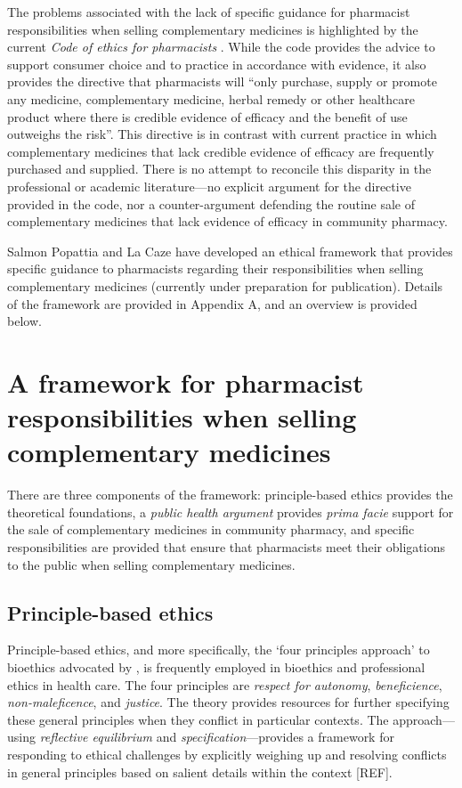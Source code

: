 \documentclass[11pt,a4paper]{article}
\begin{document}
The problems associated with the lack of specific guidance for
pharmacist responsibilities when selling complementary medicines is
highlighted by the current \emph{Code of ethics for pharmacists}
\autocite{PSA2017}. While the code provides the advice to support
consumer choice and to practice in accordance with evidence, it also
provides the directive that pharmacists will ``only purchase, supply or
promote any medicine, complementary medicine, herbal remedy or other
healthcare product where there is credible evidence of efficacy and the
benefit of use outweighs the risk''. This directive is in contrast with
current practice in which complementary medicines that lack credible
evidence of efficacy are frequently purchased and supplied. There is no
attempt to reconcile this disparity in the professional or academic
literature---no explicit argument for the directive provided in the
code, nor a counter-argument defending the routine sale of complementary
medicines that lack evidence of efficacy in community pharmacy.

Salmon Popattia and La Caze have developed an ethical framework that
provides specific guidance to pharmacists regarding their
responsibilities when selling complementary medicines (currently under
preparation for publication). Details of the framework are provided in
Appendix A, and an overview is provided below.

\section{A framework for pharmacist responsibilities when selling
complementary
medicines}\label{a-framework-for-pharmacist-responsibilities-when-selling-complementary-medicines}

There are three components of the framework: principle-based ethics
provides the theoretical foundations, a \emph{public health argument}
provides \emph{prima facie} support for the sale of complementary
medicines in community pharmacy, and specific responsibilities are
provided that ensure that pharmacists meet their obligations to the
public when selling complementary medicines.

\subsection{Principle-based ethics}\label{principle-based-ethics}

Principle-based ethics, and more specifically, the `four principles
approach' to bioethics advocated by \textcite{Beauchamp2012}, is
frequently employed in bioethics and professional ethics in health care.
The four principles are \emph{respect for autonomy},
\emph{beneficience}, \emph{non-maleficence}, and \emph{justice}. The
theory provides resources for further specifying these general
principles when they conflict in particular contexts. The
approach---using \emph{reflective equilibrium} and
\emph{specification}---provides a framework for responding to ethical
challenges by explicitly weighing up and resolving conflicts in general
principles based on salient details within the context {[}REF{]}.
\end{document}
